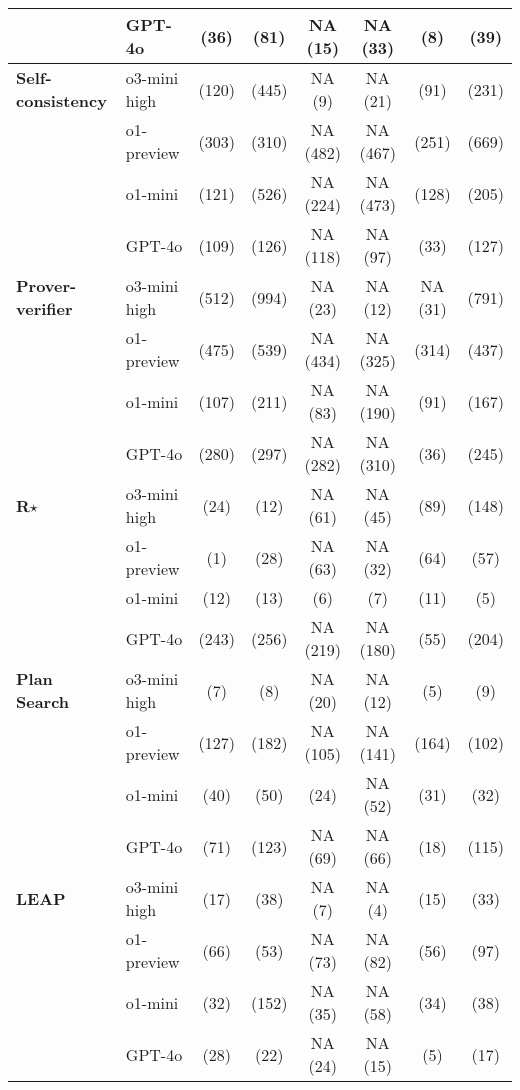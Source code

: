\begin{table}[H]
\begin{tabular}{llcccccc}
& GPT-4o & \X (36) & \C (81) & NA (15) & NA (33) & \X (8) & \C (39) \\
\midrule
\textbf{Self-consistency} 
& o3-mini high & \C (120) & \X (445) & NA (9) & NA (21) & \X (91) & \C (231) \\
& o1-preview & \C (303) & \C (310) & NA (482) & NA (467) & \X (251) & \C (669) \\
& o1-mini & \C (121) & \C (526) & NA (224) & NA (473) & \X (128) & \X (205) \\
& GPT-4o & \X (109) & \C (126) & NA (118) & NA (97) & \X (33) & \C (127) \\
\midrule
\textbf{Prover-verifier}
& o3-mini high & \C (512) & \C (994) & NA (23) & NA (12) & NA (31) & \X (791) \\
& o1-preview & \X (475) & \C (539) & NA (434) & NA (325) & \X (314) & \X (437) \\
& o1-mini & \C (107) & \C (211) & NA (83) & NA (190) & \X (91) & \X (167) \\
& GPT-4o & \X (280) & \X (297) & NA (282) & NA (310) & \X (36) & \X (245) \\
\midrule
\textbf{R$\star$} & o3-mini high & \X (24) & \X (12) & NA (61) & NA (45) & \X (89) & \X (148) \\
& o1-preview & \F (1) & \X (28) & NA (63) & NA (32)  & \X (64) & \X (57) \\
& o1-mini & \F (12) & \F (13) & \F (6) & \F (7) & \X (11) & \F (5) \\
& GPT-4o & \X (243) & \X (256) & NA (219) & NA (180) & \X (55) & \F (204) \\
\midrule
\textbf{Plan Search} & o3-mini high & \F (7) & \F (8) & NA (20) & NA (12) & \F (5) & \F (9) \\
& o1-preview & \X (127) & \X (182) & NA (105) & NA (141) & \X (164) & \X (102) \\
& o1-mini & \F (40) & \F (50) & \F (24) & NA (52)  & \X (31) & \F (32) \\
& GPT-4o & \X (71) & \X (123) & NA (69) & NA (66) & \X (18) & \C (115) \\
\midrule
\textbf{LEAP} 
& o3-mini high & \C (17) & \C (38) & NA (7) & NA (4)  & \X (15) & \X (33) \\
& o1-preview & \C (66) & \C (53) & NA (73) & NA (82) & \X (56) & \X (97) \\
& o1-mini & \C (32) & \X (152) & NA (35) & NA (58) & \X (34) & \X (38) \\
& GPT-4o & \X (28) & \X (22) & NA (24) & NA (15) & \X (5) & \X (17) \\
\bottomrule
\end{tabular}
\label{tab:IMO2024_method_model_answer_matrix}
\end{table}
